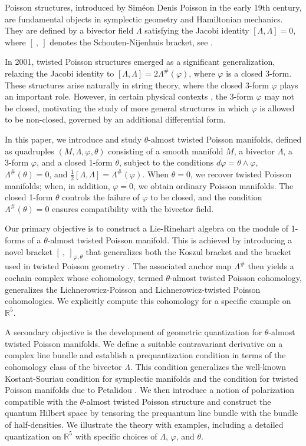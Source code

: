 \documentclass[a4paper,10pt]{article}
\numberwithin{equation}{section}
\theoremstyle{plain}
\begin{document}
Poisson structures, introduced by Sim\'{e}on Denis Poisson in the early 19th century, are fundamental objects in symplectic geometry and Hamiltonian mechanics. They are defined by a bivector field $\Lambda$ satisfying the Jacobi identity $[\Lambda,\Lambda]=0$, where $[\ ,\ ]$ denotes the Schouten-Nijenhuis bracket, see \cite{R4}.

In 2001, twisted Poisson structures \cite{R11} emerged as a significant generalization, relaxing the Jacobi identity to $[\Lambda,\Lambda] =2 \Lambda^{\#}(\varphi)$, where $\varphi$ is a closed 3-form. These structures arise naturally in string theory, where the closed 3-form $\varphi$ plays an important role. However, in certain physical contexts \cite{22}, the 3-form $\varphi$ may not be closed, motivating the study of more general structures in which $\varphi$ is allowed to be non-closed, governed by an additional differential form.

In this paper, we introduce and study $\theta$-almost twisted Poisson manifolds, defined as quadruples $(M,\Lambda,\varphi,\theta)$ consisting of a smooth manifold $M$, a bivector $\Lambda$, a 3-form $\varphi$, and a closed 1-form $\theta$, subject to the conditions $d\varphi = \theta \wedge \varphi$, $\Lambda^{\#}(\theta)=0$, and $\frac{1}{2}[\Lambda,\Lambda] = \Lambda^{\#}(\varphi)$. When $\theta=0$, we recover twisted Poisson manifolds; when, in addition, $\varphi=0$, we obtain ordinary Poisson manifolds. The closed 1-form $\theta$ controls the failure of $\varphi$ to be closed, and the condition $\Lambda^{\#}(\theta)=0$ ensures compatibility with the bivector field.

Our primary objective is to construct a Lie-Rinehart algebra on the module of 1-forms of a $\theta$-almost twisted Poisson manifold. This is achieved by introducing a novel bracket $[\ ,\ ]_{\varphi,\theta}$ that generalizes both the Koszul bracket and the bracket used in twisted Poisson geometry \cite{R11,R2}. The associated anchor map $\Lambda^{\#}$ then yields a cochain complex whose cohomology, termed $\theta$-almost twisted Poisson cohomology, generalizes the Lichnerowicz-Poisson and Lichnerowicz-twisted Poisson cohomologies. We explicitly compute this cohomology for a specific example on $\mathbb{R}^5$.

A secondary objective is the development of geometric quantization for $\theta$-almost twisted Poisson manifolds. We define a suitable contravariant derivative on a complex line bundle and establish a prequantization condition in terms of the cohomology class of the bivector $\Lambda$. This condition generalizes the well-known Kostant-Souriau condition for symplectic manifolds \cite{R22} and the condition for twisted Poisson manifolds due to Petalidou \cite{R2}. We then introduce a notion of polarization compatible with the $\theta$-almost twisted Poisson structure and construct the quantum Hilbert space by tensoring the prequantum line bundle with the bundle of half-densities. We illustrate the theory with examples, including a detailed quantization on $\mathbb{R}^5$ with specific choices of $\Lambda$, $\varphi$, and $\theta$.
\end{document}
